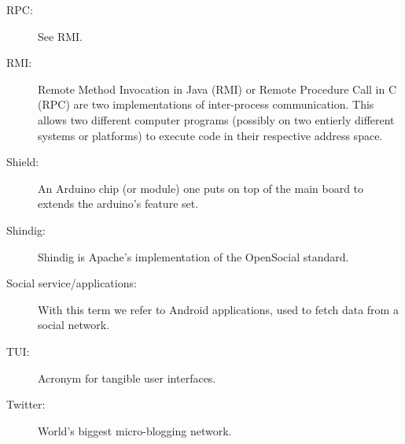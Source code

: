 \begin{description}
\item[RPC:]
	See RMI.
\item[RMI:]
	Remote Method Invocation in Java (RMI) or Remote Procedure Call in C (RPC) are two implementations of inter-process communication.
	This allows two different computer programs (possibly on two entierly different systems or platforms) to execute code in their respective
	address space.
\item[Shield:]
	An Arduino chip (or module) one puts on top of the main board to extends the arduino's feature set.
\item[Shindig:]
	Shindig is Apache's implementation of the OpenSocial standard.
\item[Social service/applications:]
	With this term we refer to Android applications, used to fetch data from a social network.
\item[TUI:]
	Acronym for tangible user interfaces.
\item[Twitter:]
	World's biggest micro-blogging network.
	
\end{description}
